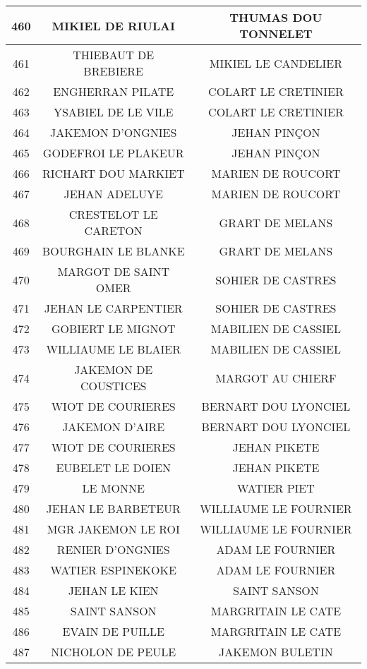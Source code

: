 \begin{center}
\begin{longtable}{|c|c|c|}
\hline	460	&	MIKIEL DE RIULAI	&	THUMAS DOU TONNELET	\\
\hline	461	&	THIEBAUT DE BREBIERE	&	MIKIEL LE CANDELIER	\\
\hline	462	&	ENGHERRAN PILATE	&	COLART LE CRETINIER	\\
\hline	463	&	YSABIEL DE LE VILE	&	COLART LE CRETINIER	\\
\hline	464	&	JAKEMON D'ONGNIES	&	JEHAN PINÇON	\\
\hline	465	&	GODEFROI LE PLAKEUR	&	JEHAN PINÇON	\\
\hline	466	&	RICHART DOU MARKIET	&	MARIEN DE ROUCORT	\\
\hline	467	&	JEHAN ADELUYE	&	MARIEN DE ROUCORT	\\
\hline	468	&	CRESTELOT LE CARETON	&	GRART DE MELANS	\\
\hline	469	&	BOURGHAIN LE BLANKE	&	GRART DE MELANS	\\
\hline	470	&	MARGOT DE SAINT OMER	&	SOHIER DE CASTRES	\\
\hline	471	&	JEHAN LE CARPENTIER	&	SOHIER DE CASTRES	\\
\hline	472	&	GOBIERT LE MIGNOT	&	MABILIEN DE CASSIEL	\\
\hline	473	&	WILLIAUME LE BLAIER	&	MABILIEN DE CASSIEL	\\
\hline	474	&	JAKEMON DE COUSTICES	&	MARGOT AU CHIERF	\\
\hline	475	&	WIOT DE COURIERES	&	BERNART DOU LYONCIEL	\\
\hline	476	&	JAKEMON D'AIRE	&	BERNART DOU LYONCIEL	\\
\hline	477	&	WIOT DE COURIERES	&	JEHAN PIKETE	\\
\hline	478	&	EUBELET LE DOIEN	&	JEHAN PIKETE	\\
\hline	479	&	LE MONNE	&	WATIER PIET	\\
\hline	480	&	JEHAN LE BARBETEUR	&	WILLIAUME LE FOURNIER	\\
\hline	481	&	MGR JAKEMON LE ROI	&	WILLIAUME LE FOURNIER	\\
\hline	482	&	RENIER D'ONGNIES	&	ADAM LE FOURNIER	\\
\hline	483	&	WATIER ESPINEKOKE	&	ADAM LE FOURNIER	\\
\hline	484	&	JEHAN LE KIEN	&	SAINT SANSON	\\
\hline	485	&	SAINT SANSON	&	MARGRITAIN LE CATE	\\
\hline	486	&	EVAIN DE PUILLE	&	MARGRITAIN LE CATE	\\
\hline	487	&	NICHOLON DE PEULE	&	JAKEMON BULETIN	\\

\end{longtable}
\end{center}
